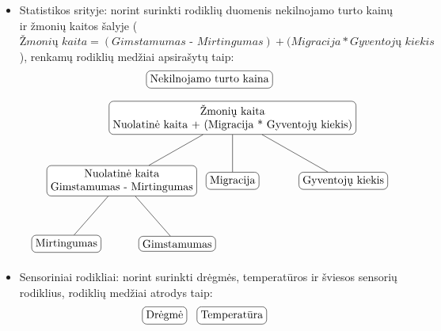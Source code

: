 \documentclass{VUMIFPSbakalaurinis}
\begin{document}
\begin{itemize}
    \item Statistikos srityje: norint surinkti rodiklių duomenis nekilnojamo turto kainų ir žmonių kaitos šalyje (\(\textit{Žmonių kaita} = (\textit{Gimstamumas - Mirtingumas}) + (\textit{Migracija} * \textit{Gyventojų kiekis}\)), renkamų rodiklių medžiai apsirašytų taip: 
    \[	
        \begin{tikzpicture}[sibling distance=7em, every node/.style = {shape=rectangle, rounded                                corners, draw, align=center,	
            top color=white, bottom color=white}]	
            \node{Nekilnojamo turto kaina};
        \end{tikzpicture} 
    \]
    \[
        \begin{tikzpicture}[sibling distance=10em,
            level distance=2cm,
            every node/.style = {shape=rectangle, rounded corners,	
                                 draw, align=center,	
                                 top color=white, bottom color=white}]	
            \node{Žmonių kaita\\Nuolatinė kaita + (Migracija * Gyventojų kiekis)}
                    child { node {Nuolatinė kaita\\Gimstamumas - Mirtingumas} 
                            child {node {Mirtingumas}}
                            child {node {Gimstamumas}} }	
                    child { node {Migracija} } 	
                    child { node {Gyventojų kiekis} }; 	
        \end{tikzpicture} 	
    \]
    \item Sensoriniai rodikliai: norint surinkti drėgmės, temperatūros ir šviesos sensorių rodiklius, rodiklių medžiai atrodys taip:
    \[	
        \begin{tikzpicture}[sibling distance=7em,  every node/.style = {shape=rectangle,  
                                rounded corners, draw, align=center,	
                                top color=white, bottom color=white}]	
            \node{Drėgmė};
        \end{tikzpicture}\>\>\>\>
        \begin{tikzpicture}[sibling distance=7em, every node/.style = {shape=rectangle, 
                                rounded corners, draw, align=center,	
                                top color=white, bottom color=white}]	
            \node{Temperatūra};
        \end{tikzpicture}\>\>\>\>
        \begin{tikzpicture}[sibling distance=7em, every node/.style = {shape=rectangle, rounded                                corners, draw, align=center,	
                                top color=white, bottom color=white}]	

\end{tikzpicture}\]
\end{itemize}
\end{document}
